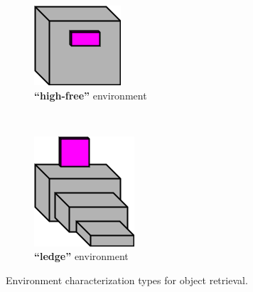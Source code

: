 \documentclass[conference]{IEEEtran}
\begin{document}
\begin{figure}[t]
    \begin{subfigure}[t]{0.15\textwidth}
        \includegraphics[width=\textwidth]{images/HighFreeEnvironment.png}
        \caption{\textbf{``high-free''} environment}
    \end{subfigure} \ \ \ \ \ \
    \begin{subfigure}[t]{0.15\textwidth}
        \includegraphics[width=\textwidth]{images/LedgeEnvironment.png}
        \caption{\textbf{``ledge''} environment}
    \end{subfigure}
      \caption{Environment characterization types for object retrieval.}
      \label{fig:characters}
   \end{figure}
\end{document}
